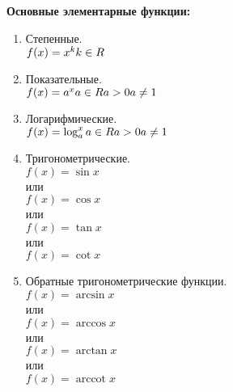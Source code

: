 \documentclass[oneside]{book}
\begin{document}
	\textbf{Основные элементарные функции:}
	\begin{enumerate}
		\item Степенные.
		\\
		\begin{math}
			f(x) = x^k
			\\
			k \in R
		\end{math}

		\item Показательные.
		\\
		\begin{math}
			f(x) = a^x
			\\
			a \in R
			\\
			a > 0
			\\
			a \neq 1
		\end{math}

		\item Логарифмические.
		\\
		\begin{math}
			f(x) = \log_a^x
			\\
			a \in R
			\\
			a > 0
			\\
			a \neq 1
		\end{math}

		\item Тригонометрические.
		\\
		\begin{math}
			f(x) = \sin x
		\end{math}
		\\
		или
		\\
		\begin{math}
			f(x) = \cos x
		\end{math}
		\\
		или
		\\
		\begin{math}
			f(x) = \tan x
		\end{math}
		\\
		или
		\\
		\begin{math}
			f(x) = \cot x 
		\end{math}

		\item Обратные тригонометрические функции.
		\\
		\begin{math}
			f(x) = \arcsin x
		\end{math}
		\\
		или
		\\
		\begin{math}
			f(x) = \arccos x
		\end{math}
		\\
		или
		\\
		\begin{math}
			f(x) = \arctan x
		\end{math}
		\\
		или
		\\
		\begin{math}
			f(x) = \operatorname{arccot} x
		\end{math}
	\end{enumerate}
\end{document}
